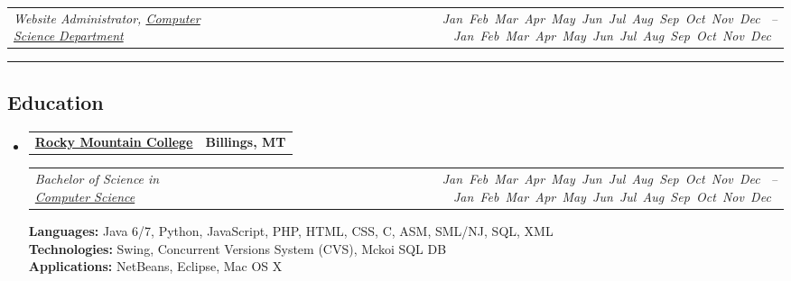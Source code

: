 \documentclass[9pt,letterpaper]{extarticle}
\makeatletter
\newcommand{\headerrow}[2]
{\begin{tabular*}{\linewidth}{l@{\extracolsep{\fill}}r}
	#1 &
	#2 \\
\end{tabular*}}
\newcommand{\DatestampYM}[2]{\mbox{\ShortMonth{#2} #1}}
\newcommand{\ShortMonth}[1]{
\ifcase#1\relax
\or Jan
\or Feb
\or Mar
\or Apr
\or May
\or Jun
\or Jul
\or Aug
\or Sep
\or Oct
\or Nov
\or Dec
\fi}
\makeatother
\begin{document}
\begin{itemize}
	\headerrow
		{\emph{Website Administrator, \href{http://cs.rocky.edu/programming-competitions/high-school-competions/}{Computer Science Department}}}
		{\emph{\DatestampYM{2010}{09} -- \DatestampYM{2011}{05}}}
\end{itemize}


\hrule
\vspace{-0.2em}
\subsection*{Education}

\begin{itemize}
	\parskip=0.1em

	\item
	\headerrow
		{\textbf{\href{http://www.rocky.edu/}{Rocky Mountain College}}}
		{\textbf{Billings, MT}}
	\headerrow
		{\emph{Bachelor of Science in \href{http://cs.rocky.edu/}{Computer Science}}}
		{\emph{\DatestampYM{2010}{08} -- \DatestampYM{2014}{05}}}
	\textbf{Languages:} Java 6/7, Python, JavaScript, PHP, HTML, CSS, C, ASM, SML/NJ, SQL, XML
	\\\textbf{Technologies:} Swing, Concurrent Versions System (CVS), Mckoi SQL DB
	\\\textbf{Applications:} NetBeans, Eclipse, Mac OS X
\end{itemize}
\end{document}
